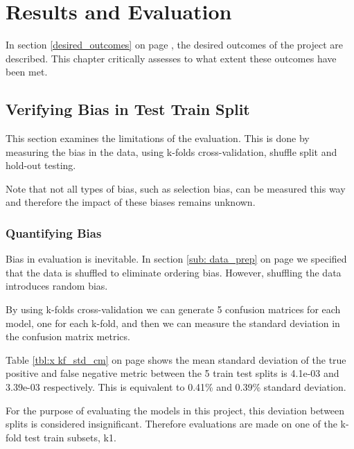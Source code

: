 \chapter{Results and Evaluation}

In section \ref{desired_outcomes} on page \pageref{desired_outcomes}, the desired outcomes of the project are described. This chapter critically assesses to what extent these outcomes have been met.

\section{Verifying Bias in Test Train Split}

This section examines the limitations of the evaluation. This is done by measuring the bias in the data, using k-folds cross-validation, shuffle split and hold-out testing.

Note that not all types of bias, such as selection bias, can be measured this way and therefore the impact of these biases remains unknown.

\subsection{Quantifying Bias}

Bias in evaluation is inevitable. In section \ref{sub: data_prep} on page \pageref{sub: data_prep} we specified that the data is shuffled to eliminate ordering bias. However, shuffling the data introduces random bias. 

By using k-folds cross-validation we can generate 5 confusion matrices for each model, one for each k-fold, and then we can measure the standard deviation in the confusion matrix metrics.

Table \ref{tbl:x kf_std_cm} on page \pageref{tbl:x kf_std_cm} shows the mean standard deviation of the true positive and false negative metric between the 5 train test splits is 4.1e-03 and 3.39e-03 respectively. This is equivalent to 0.41\% and 0.39\% standard deviation.

For the purpose of evaluating the models in this project, this deviation between splits is considered insignificant. Therefore evaluations are made on one of the k-fold test train subsets, k1.

